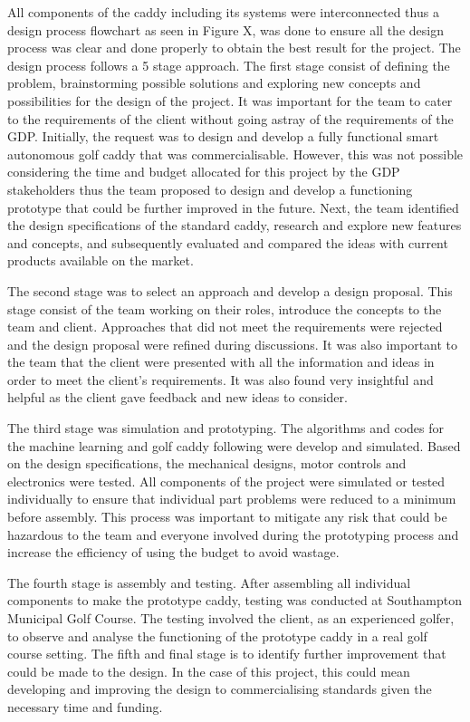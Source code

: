 \documentclass[11pt,landscape]{article}
\begin{document}
\begin{multicols}{3}
All components of the caddy including its systems were interconnected thus a
design process flowchart as seen in Figure X, was done to ensure all the design
process was clear and done properly to obtain the best result for the project.
The design process follows a 5 stage approach. The first stage consist of
defining the problem, brainstorming possible solutions and exploring new
concepts and possibilities for the design of the project. It was important for
the team to cater to the requirements of the client without going astray of the
requirements of the GDP. Initially, the request was to design and develop a
fully functional smart autonomous golf caddy that was commercialisable. However,
this was not possible considering the time and budget allocated for this project
by the GDP stakeholders thus the team proposed to design and develop a
functioning prototype that could be further improved in the future. Next, the
team identified the design specifications of the standard caddy, research and
explore new features and concepts, and subsequently evaluated and compared the
ideas with current products available on the market. 

The second stage was to select an approach and develop a design proposal. This
stage consist of the team working on their roles, introduce the concepts to the
team and client. Approaches that did not meet the requirements were rejected and
the design proposal were refined during discussions. It was also important to
the team that the client were presented with all the information and ideas in
order to meet the client’s requirements. It was also found very insightful and
helpful as the client gave feedback and new ideas to consider. 

The third stage was simulation and prototyping. The algorithms and codes for the
machine learning and golf caddy following were develop and simulated. Based on
the design specifications, the mechanical designs, motor controls and
electronics were tested. All components of the project were simulated or tested
individually to ensure that individual part problems were reduced to a minimum
before assembly. This process was important to mitigate any risk that could be
hazardous to the team and everyone involved during the prototyping process and
increase the efficiency of using the budget to avoid wastage. 

The fourth stage is assembly and testing. After assembling all individual
components to make the prototype caddy, testing was conducted at Southampton
Municipal Golf Course. The testing involved the client, as an experienced
golfer, to observe and analyse the functioning of the prototype caddy in a real
golf course setting. The fifth and final stage is to identify further
improvement that could be made to the design. In the case of this project, this
could mean developing and improving the design to commercialising standards
given the necessary time and funding. 


\newpage
\end{multicols}
\end{document}
